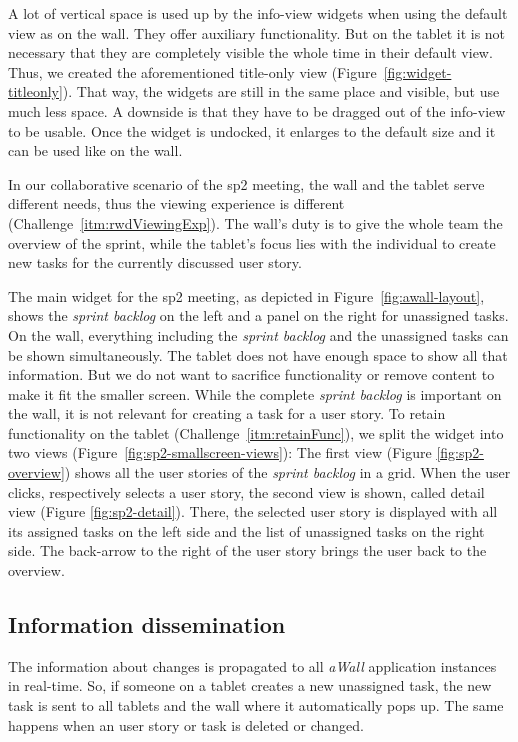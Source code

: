 \documentclass{sigchi}
\begin{document}
A lot of vertical space is used up by the info-view widgets when using the default view as on the wall.
They offer auxiliary functionality. But on the tablet it is not necessary that they are completely visible the whole time in their default view.
Thus, we created the aforementioned title-only view (Figure~\ref{fig:widget-titleonly}).
That way, the widgets are still in the same place and visible, but use much less space.
A downside is that they have to be dragged out of the info-view to be usable.
Once the widget is undocked, it enlarges to the default size and it can be used like on the wall.
	
In our collaborative scenario of the \gls{sp2} meeting, the wall and the tablet serve different needs, thus the viewing experience is different (Challenge~\ref{itm:rwdViewingExp}).
The wall's duty is to give the whole team the overview of the sprint, while the tablet's focus lies with the individual to create new tasks for the currently discussed user story.

The main widget for the \gls{sp2} meeting, as depicted in Figure~\ref{fig:awall-layout}, shows the \textit{sprint backlog} on the left and a panel on the right for unassigned tasks.
On the wall, everything including the \textit{sprint backlog} and the unassigned tasks can be shown simultaneously.
The tablet does not have enough space to show all that information.
But we do not want to sacrifice functionality or remove content to make it fit the smaller screen.
While the complete \textit{sprint backlog} is important on the wall, it is not relevant for creating a task for a user story.
To retain functionality on the tablet (Challenge~\ref{itm:retainFunc}), we split the widget into two views (Figure~\ref{fig:sp2-smallscreen-views}):
The first view (Figure \ref{fig:sp2-overview}) shows all the user stories of the \textit{sprint backlog} in a grid.
When the user clicks, respectively selects a user story, the second view is shown, called detail view (Figure \ref{fig:sp2-detail}).
There, the selected user story is displayed with all its assigned tasks on the left side and the list of unassigned tasks on the right side.
The back-arrow to the right of the user story brings the user back to the overview.


\subsection{Information dissemination}
The information about changes is propagated to all \textit{aWall} application instances in real-time.
So, if someone on a tablet creates a new unassigned task, the new task is sent to all tablets and the wall where it automatically pops up.
The same happens when an user story or task is deleted or changed.
\end{document}
